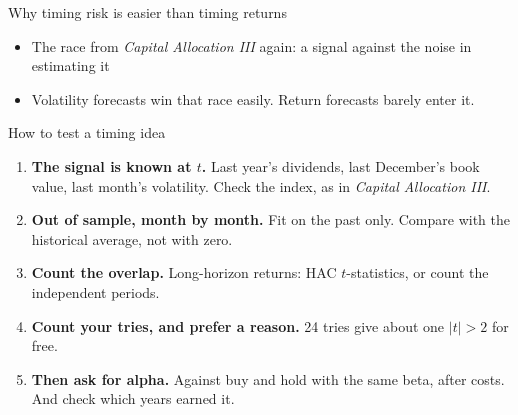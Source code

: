 \documentclass[aspectratio=169,10pt]{beamer}
\begin{document}
\begin{frame}{Why timing risk is easier than timing returns}
\vskip 4pt
\begin{center}
\renewcommand{\arraystretch}{1.4}
\end{center}
\vskip 10pt
\begin{itemize}
\item The race from \emph{Capital Allocation III} again: a signal against the noise in estimating it
\vskip 6pt
\item Volatility forecasts win that race easily. Return forecasts barely enter it.
\end{itemize}
\end{frame}

\begin{frame}{How to test a timing idea}
\vskip 6pt
\begin{enumerate}
\item \textbf{The signal is known at $t$.} Last year's dividends, last December's book value, last month's volatility. Check the index, as in \emph{Capital Allocation III}.
\vskip 6pt
\item \textbf{Out of sample, month by month.} Fit on the past only. Compare with the historical average, not with zero.
\vskip 6pt
\item \textbf{Count the overlap.} Long-horizon returns: HAC $t$-statistics, or count the independent periods.
\vskip 6pt
\item \textbf{Count your tries, and prefer a reason.} 24 tries give about one $|t| > 2$ for free.
\vskip 6pt
\item \textbf{Then ask for alpha.} Against buy and hold with the same beta, after costs. And check which years earned it.
\end{enumerate}
\end{frame}
\end{document}
